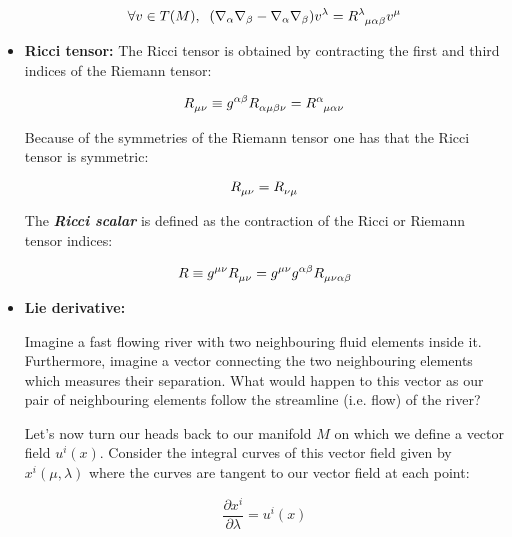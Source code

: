 \documentclass[12pt]{article}
\numberwithin{equation}{section}
\numberwithin{theorem}{subsection}
\begin{document}
\begin{itemize}
\begin{equation}

    \forall v \in T(M), \; \; 

    (\nabla_{\alpha}\nabla_{\beta}-\nabla_{\alpha}\nabla_{\beta})v^{\lambda} = \tensor{R}{^\lambda_\mu_\alpha_\beta}\tensor{v}{^\mu}

\end{equation}

\item \textbf{Ricci tensor:} The Ricci tensor is obtained by contracting the first and third indices of the Riemann tensor:

$$\tensor{R}{_\mu_\nu} \equiv \tensor{g}{^\alpha^\beta}\tensor{R}{_\alpha_\mu_\beta_\nu} = \tensor{R}{^\alpha_\mu_\alpha_\nu}$$

Because of the symmetries of the Riemann tensor one has that the Ricci tensor is symmetric:

$$\tensor{R}{_\mu_\nu} = \tensor{R}{_\nu_\mu}$$

The \textbf{\textit{Ricci scalar}} is defined as the contraction of the Ricci or Riemann tensor indices:

$$R \equiv \tensor{g}{^\mu^\nu}\tensor{R}{_\mu_\nu} = \tensor{g}{^\mu^\nu}\tensor{g}{^\alpha^\beta}\tensor{R}{_\mu_\nu_\alpha_\beta}$$

\item\textbf{Lie derivative:}

Imagine a fast flowing river with two neighbouring fluid elements inside it. Furthermore, imagine a vector connecting the two neighbouring elements which measures their separation. What would happen to this vector as our pair of neighbouring elements follow the streamline (i.e. flow) of the river? \newline

Let's now turn our heads back to our manifold $M$ on which we define a vector field $u^{i}(x)$. Consider the integral curves of this vector field given by $x^{i}(\mu,\lambda)$ where the curves are tangent to our vector field at each point:

\begin{equation}

    \frac{\partial x^{i}}{\partial \lambda} = u^{i}(x)

\end{equation}

\end{itemize}
\end{document}
